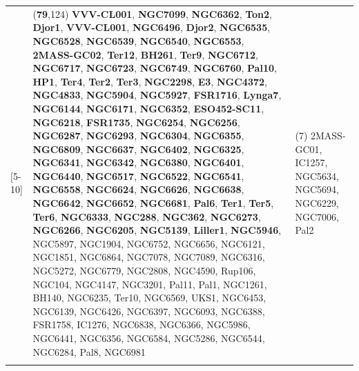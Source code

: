 \begin{table}
\begin{tabularx}{\textwidth}{l X X }
        [5-10] & (\textbf{79},124) \textbf{VVV-CL001}, \textbf{NGC7099}, \textbf{NGC6362}, \textbf{Ton2}, \textbf{Djor1}, \textbf{VVV-CL001}, \textbf{NGC6496}, \textbf{Djor2}, \textbf{NGC6535}, \textbf{NGC6528}, \textbf{NGC6539}, \textbf{NGC6540}, \textbf{NGC6553}, \textbf{2MASS-GC02}, \textbf{Ter12}, \textbf{BH261}, \textbf{Ter9}, \textbf{NGC6712}, \textbf{NGC6717}, \textbf{NGC6723}, \textbf{NGC6749}, \textbf{NGC6760}, \textbf{Pal10}, \textbf{HP1}, \textbf{Ter4}, \textbf{Ter2}, \textbf{Ter3}, \textbf{NGC2298}, \textbf{E3}, \textbf{NGC4372}, \textbf{NGC4833}, \textbf{NGC5904}, \textbf{NGC5927}, \textbf{FSR1716}, \textbf{Lynga7}, \textbf{NGC6144}, \textbf{NGC6171}, \textbf{NGC6352}, \textbf{ESO452-SC11}, \textbf{NGC6218}, \textbf{FSR1735}, \textbf{NGC6254}, \textbf{NGC6256}, \textbf{NGC6287}, \textbf{NGC6293}, \textbf{NGC6304}, \textbf{NGC6355}, \textbf{NGC6809}, \textbf{NGC6637}, \textbf{NGC6402}, \textbf{NGC6325}, \textbf{NGC6341}, \textbf{NGC6342}, \textbf{NGC6380}, \textbf{NGC6401}, \textbf{NGC6440}, \textbf{NGC6517}, \textbf{NGC6522}, \textbf{NGC6541}, \textbf{NGC6558}, \textbf{NGC6624}, \textbf{NGC6626}, \textbf{NGC6638}, \textbf{NGC6642}, \textbf{NGC6652}, \textbf{NGC6681}, \textbf{Pal6}, \textbf{Ter1}, \textbf{Ter5}, \textbf{Ter6}, \textbf{NGC6333}, \textbf{NGC288}, \textbf{NGC362}, \textbf{NGC6273}, \textbf{NGC6266}, \textbf{NGC6205}, \textbf{NGC5139}, \textbf{Liller1}, \textbf{NGC5946}, NGC5897, NGC1904, NGC6752, NGC6656, NGC6121, NGC1851, NGC6864, NGC7078, NGC7089, NGC6316, NGC5272, NGC6779, NGC2808, NGC4590, Rup106, NGC104, NGC4147, NGC3201, Pal11, Pal1, NGC1261, BH140, NGC6235, Ter10, NGC6569, UKS1, NGC6453, NGC6139, NGC6426, NGC6397, NGC6093, NGC6388, FSR1758, IC1276, NGC6838, NGC6366, NGC5986, NGC6441, NGC6356, NGC6584, NGC5286, NGC6544, NGC6284, Pal8, NGC6981 & (7) 2MASS-GC01, IC1257, NGC5634, NGC5694, NGC6229, NGC7006, Pal2\\ 
        \vspace{0.1cm}


\end{tabularx}
\end{table}
